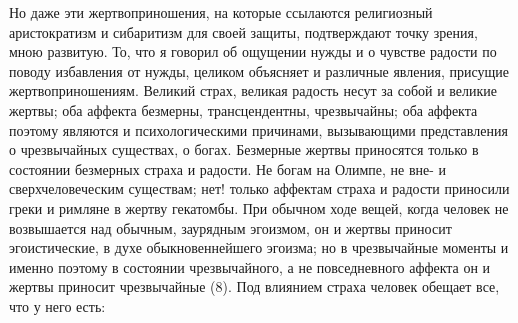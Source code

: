 \documentclass[12pt]{article}
\begin{document}
Но даже эти жертвоприношения, на которые ссылаются религиозный аристократизм и сибаритизм для своей защиты, подтверждают точку зрения, мною развитую. То, что я говорил об ощущении нужды и о чувстве радости по поводу избавления от нужды, целиком объясняет и различные явления, присущие жертвоприношениям. Великий страх, великая радость несут за собой и великие жертвы; оба аффекта безмерны, трансцендентны, чрезвычайны; оба аффекта поэтому являются и психологическими причинами, вызывающими представления о чрезвычайных существах, о богах. Безмерные жертвы приносятся только в состоянии безмерных страха и радости. Не богам на Олимпе, не вне- и сверхчеловеческим существам; нет! только аффектам страха и радости приносили греки и римляне в жертву гекатомбы. При обычном ходе вещей, когда человек не возвышается над обычным, заурядным эгоизмом, он и жертвы приносит эгоистические, в духе обыкновеннейшего эгоизма; но в чрезвычайные моменты и именно поэтому в состоянии чрезвычайного, а не повседневного аффекта он и жертвы приносит чрезвычайные (8). Под влиянием страха человек обещает все, что у него есть: 
\end{document}
